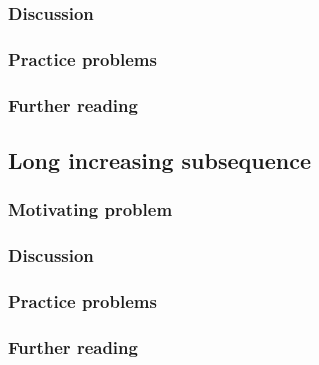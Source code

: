 




\subsubsection*{Discussion}

\subsubsection*{Practice problems}

\subsubsection*{Further reading}

\subsection{Long increasing subsequence}

\subsubsection*{Motivating problem}







\subsubsection*{Discussion}

\subsubsection*{Practice problems}

\subsubsection*{Further reading}


